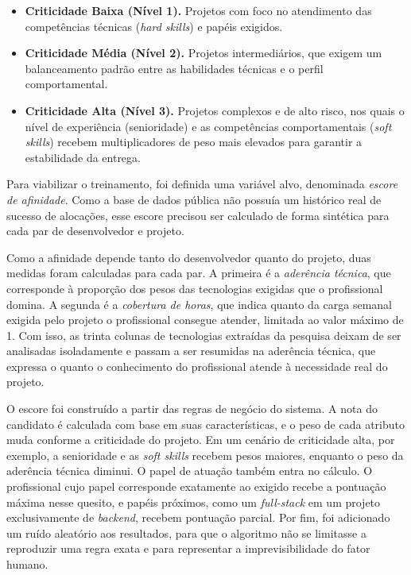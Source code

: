 \begin{itemize}
    \item \textbf{Criticidade Baixa (Nível 1).} Projetos com foco no atendimento das competências técnicas (\textit{hard skills}) e papéis exigidos.
    \item \textbf{Criticidade Média (Nível 2).} Projetos intermediários, que exigem um balanceamento padrão entre as habilidades técnicas e o perfil comportamental.
    \item \textbf{Criticidade Alta (Nível 3).} Projetos complexos e de alto risco, nos quais o nível de experiência (senioridade) e as competências comportamentais (\textit{soft skills}) recebem multiplicadores de peso mais elevados para garantir a estabilidade da entrega.
\end{itemize}

Para viabilizar o treinamento, foi definida uma variável alvo, denominada \textit{escore de afinidade}. Como a base de dados pública não possuía um histórico real de sucesso de alocações, esse escore precisou ser calculado de forma sintética para cada par de desenvolvedor e projeto.

Como a afinidade depende tanto do desenvolvedor quanto do projeto, duas medidas foram calculadas para cada par. A primeira é a \textit{aderência técnica}, que corresponde à proporção dos pesos das tecnologias exigidas que o profissional domina. A segunda é a \textit{cobertura de horas}, que indica quanto da carga semanal exigida pelo projeto o profissional consegue atender, limitada ao valor máximo de 1. Com isso, as trinta colunas de tecnologias extraídas da pesquisa deixam de ser analisadas isoladamente e passam a ser resumidas na aderência técnica, que expressa o quanto o conhecimento do profissional atende à necessidade real do projeto.

O escore foi construído a partir das regras de negócio do sistema. A nota do candidato é calculada com base em suas características, e o peso de cada atributo muda conforme a criticidade do projeto. Em um cenário de criticidade alta, por exemplo, a senioridade e as \textit{soft skills} recebem pesos maiores, enquanto o peso da aderência técnica diminui. O papel de atuação também entra no cálculo. O profissional cujo papel corresponde exatamente ao exigido recebe a pontuação máxima nesse quesito, e papéis próximos, como um \textit{full-stack} em um projeto exclusivamente de \textit{backend}, recebem pontuação parcial. Por fim, foi adicionado um ruído aleatório aos resultados, para que o algoritmo não se limitasse a reproduzir uma regra exata e para representar a imprevisibilidade do fator humano.

